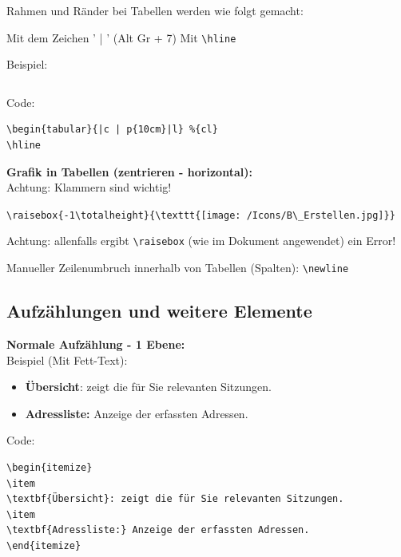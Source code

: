 \vspace{\baselineskip}

Rahmen und Ränder bei Tabellen werden wie folgt gemacht:

Mit dem Zeichen ' | ' (Alt Gr + 7)
Mit \verb+\hline+

Beispiel:
\begin{tabular}{|c | p{10cm}|l} %
\hline
\end{tabular}

Code:
\begin{verbatim}
\begin{tabular}{|c | p{10cm}|l} %{cl}
\hline
\end{verbatim}

\vspace{\baselineskip}

\textbf{Grafik in Tabellen (zentrieren - horizontal):}\\
Achtung: Klammern sind wichtig!

\verb+\raisebox{-1\totalheight}{\texttt{[image: /Icons/B\_Erstellen.jpg]}}+

Achtung: allenfalls ergibt \verb+\raisebox+ (wie im Dokument angewendet) ein Error!

\vspace{\baselineskip}

Manueller Zeilenumbruch innerhalb von Tabellen (Spalten): \verb+\newline+





\subsection{Aufzählungen und weitere Elemente}

\textbf{Normale Aufzählung - 1 Ebene:}\\

Beispiel (Mit Fett-Text):
\begin{itemize}
\item
\textbf{Übersicht}: zeigt die für Sie relevanten Sitzungen.
\item
\textbf{Adressliste:} Anzeige der erfassten Adressen.
\end{itemize}

Code:
\begin{verbatim}
\begin{itemize}
\item
\textbf{Übersicht}: zeigt die für Sie relevanten Sitzungen.
\item
\textbf{Adressliste:} Anzeige der erfassten Adressen.
\end{itemize}
\end{verbatim}

